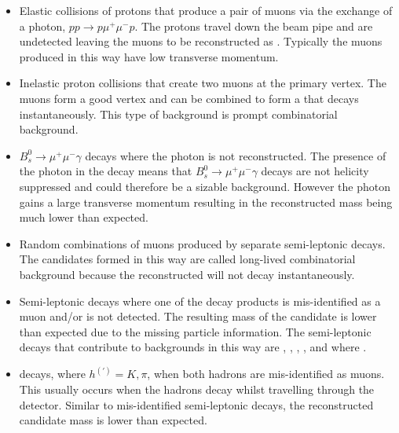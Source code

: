 \begin{itemize}
\item Elastic collisions of protons that produce a pair of muons via the exchange of a photon, $pp \to p \mu^{+} \mu^{-} p$. The protons travel down the beam pipe and are undetected leaving the muons to be reconstructed as \bmumu. Typically the muons produced in this way have low transverse momentum. %
\item Inelastic proton collisions that create two muons at the primary vertex. The muons form a good vertex and can be combined to form a \bsd that decays instantaneously. This type of background is prompt combinatorial background. 
\item $B_{s}^{0}\to\mu^{+}\mu^{-}\gamma$ decays where the photon is not reconstructed. The presence of the photon in the decay means that $B_{s}^{0}\to\mu^{+}\mu^{-}\gamma$ decays are not helicity suppressed and could therefore be a sizable background. However the photon gains a large transverse momentum resulting in the reconstructed \bsd mass being much lower than expected.
\item Random combinations of muons produced by separate semi-leptonic decays. The \bmumu candidates formed in this way are called long-lived combinatorial background because the reconstructed \bsd will not decay instantaneously. %
\item Semi-leptonic decays where one of the decay products is mis-identified as a muon and/or is not detected. The resulting mass of the \bsd candidate is lower than expected due to the missing particle information. The semi-leptonic decays that contribute to \bmumu backgrounds in this way are \bdpimunu, \bsKmunu, \lambdab, \bupimumu, \bdpimumu and \bcjpsimunu where \jpsimumu. %
\item \bhh decays, where $ h^{(')}  = K, \pi$, when both hadrons are mis-identified as muons. This usually occurs when the hadrons decay whilst travelling through the detector. Similar to mis-identified semi-leptonic decays, the reconstructed \bsd candidate mass is lower than expected. %
\end{itemize}

